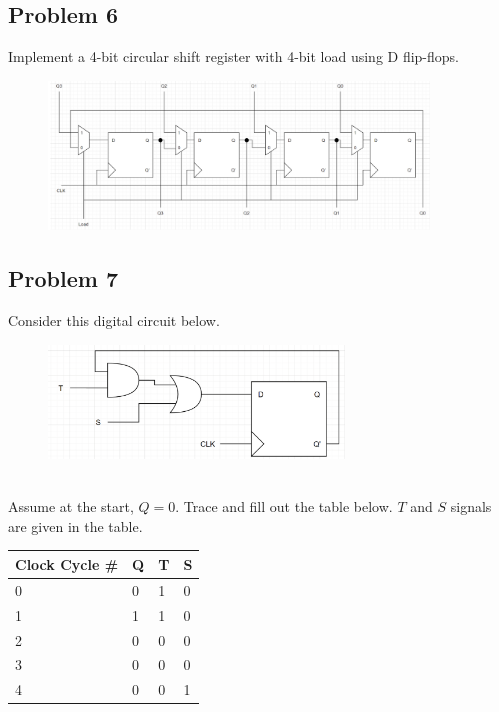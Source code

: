\documentclass{article}
\begin{document}
\subsection*{Problem 6}
Implement a 4-bit circular shift register with 4-bit load using D flip-flops.
\begin{figure}[!h]
    \centering
    \includegraphics[width=0.9\textwidth]{figures/latch6_solution.png}
\end{figure}

\newpage
\subsection*{Problem 7}
Consider this digital circuit below. \\
\begin{figure}[!h]
    \centering
    \includegraphics[width=0.7\textwidth]{figures/latch7.png}
\end{figure} \\
Assume at the start, $Q = 0$. Trace and fill out the table below. $T$ and $S$ signals are given in the table.
\begin{table}[!h]
\centering
\begin{tabular}{|l|l|l|l|}
\hline
\textbf{Clock Cycle \#} & \textbf{Q} & \textbf{T} & \textbf{S} \\ \hline
0                       & 0          & 1          & 0          \\ \hline
1                       & 1          & 1          & 0          \\ \hline
2                       & 0          & 0          & 0          \\ \hline
3                       & 0          & 0          & 0          \\ \hline
4                       & 0          & 0          & 1          \\ \hline
\end{tabular}
\end{table}
\end{document}
